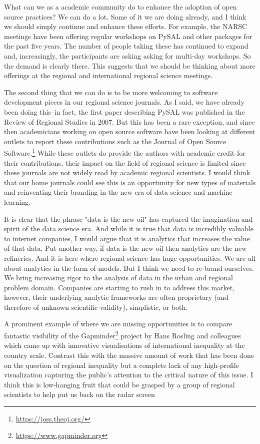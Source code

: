 \documentclass[11pt]{article}
\begin{document}
What can we as a academic community do to enhance the adoption of open source
practices? We can do a lot. Some of it we are doing already, and I think we
should simply continue and enhance these efforts. For example, the NARSC
meetings have been offering regular workshops on PySAL and other packages
for the past five years. The number of people taking these has
continued to expand and, increasingly, the participants are asking asking for
multi-day workshops. So the demand is clearly there. This suggests that we
should be thinking about more offerings at the regional and international
regional science meetings.

The second thing that we can do is to be more welcoming to software development
pieces in our regional science journals. As I said, we have already been doing
this--in fact, the first paper describing PySAL was published in the Review of
Regional Studies in 2007. But this has been a rare exception, and since then
academicians working on open source software have been looking at different
outlets to report these contributions such as the Journal of Open Source
Software.\footnote{\url{https://joss.theoj.org/}} While these outlets do provide the authors with academic credit for
their contributions, their impact on the field of regional science is limited
since these journals are not widely read by academic regional scientists. I
would think that our home journals could see this is an opportunity for new
types of materials and reinventing their branding in the new era of  
data science and machine learning. 


It is clear that the phrase "data is the new oil" has captured the imagination
and spirit of the data science era. And while it is true that data is incredibly
valuable to internet companies, I would argue that it is analytics that
increases the value of that data. Put another way, if data is the new oil then
analytics are the new refineries. And it is here where regional science has huge
opportunities. We are all about analytics in the form of models. But I think we
need to re-brand ourselves. We bring increasing rigor to the analysis of data in
the urban and regional problem domain.  Companies are starting to rush in
to address this market, however, their underlying analytic frameworks are often
proprietary (and therefore of unknown scientific validity), simplistic, or both.

A prominent example of where we are missing opportunities is to compare
fantastic visibility of the Gapminder\footnote{\url{https://www.gapminder.org}} project by
Hans Rosling and colleagues which came up with innovative visualisations of
international inequality at the country scale. Contrast this with the massive
amount of work that has been done on the question of regional inequality but
a complete lack of any high-profile visualization capturing the public's
attention to the critical nature of this issue. I think this is low-hanging
fruit that could be grasped by a group of regional scientists to help put
us back on the radar screen
\end{document}
